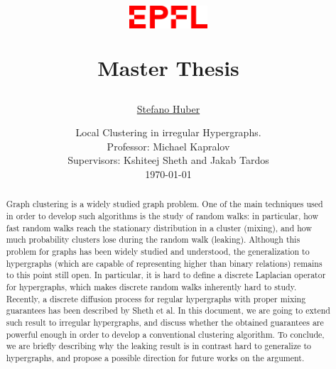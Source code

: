 \documentclass[a4paper]{article}
\begin{document}
	\title{
    	\begin{figure}[!ht]
    	    \centering
    		\includegraphics[width=0.26\textwidth]{epfl_logo.png}
    	\end{figure}
    	\vspace{1cm}
    	\Huge Master Thesis \\
	}
	
	\vspace{1cm}
	
	\author{\Large \href{mailto:stefano.huber@epfl.ch}{Stefano Huber}
	\vspace{1cm}}
	
	\date{
	\large Local Clustering in irregular Hypergraphs. \\
	\vspace{0.8cm}
	\large Professor: Michael Kapralov \\
	\large Supervisors: Kshiteej Sheth and Jakab Tardos \\
	\vspace{1cm}
	\today
	}

	\maketitle
	\setlength{\parindent}{0pt}

\vspace{2cm}
\begin{abstract}
    Graph clustering is a widely studied graph problem. One of the main techniques used in order to develop such algorithms is the study of random walks: in particular, how fast random walks reach the stationary distribution in a cluster (mixing), and how much probability clusters lose during the random walk (leaking). Although this problem for graphs has been widely studied and understood, the generalization to hypergraphs (which are capable of representing higher than binary relations) remains to this point still open. In particular, it is hard to define a discrete Laplacian operator for hypergraphs, which makes discrete random walks inherently hard to study. Recently, a discrete diffusion process for regular hypergraphs with proper mixing guarantees has been described by Sheth et al. In this document, we are going to extend such result to irregular hypergraphs, and discuss whether the obtained guarantees are powerful enough in order to develop a conventional clustering algorithm. To conclude, we are briefly describing why the leaking result is in contrast hard to generalize to hypergraphs, and propose a possible direction for future works on the argument.
\end{abstract}
	\newpage
	\tableofcontents
	\newpage
	
\end{document}
